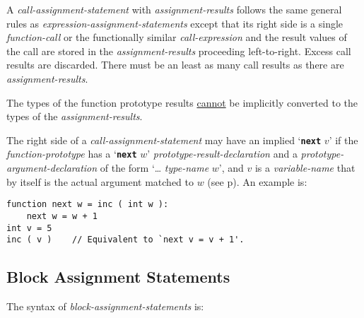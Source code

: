 \documentclass[12pt]{article}
\newcommand{\TT}[1]{{\tt \bfseries #1}}
\newcommand{\pagref}[1]{p\pageref{#1}}
\newenvironment{indpar}[1][0.3in]%
	{\begin{list}{}%
		     {\setlength{\itemsep}{0in}%
		      \setlength{\topsep}{0in}%
		      \setlength{\parsep}{1ex}%
		      \setlength{\labelwidth}{#1}%
		      \setlength{\leftmargin}{#1}%
		      \addtolength{\leftmargin}{\labelsep}}%
	 \item}%
	{\end{list}}
\begin{document}
A {\em call-assignment-statement} with {\em assignment-results}
follows the same general rules
as {\em expres\-sion-assignment-state\-ments} except that its right
side is a single {\em function-call} or the functionally similar
{\em call-expression} and the result values of the call are stored
in the {\em assignment-results} proceeding left-to-right.
Excess call results are discarded.  There must be an least as many
call results as there are {\em assignment-results}.

The types of the function prototype results \underline{cannot}
be implicitly converted to the types of the {\em assignment-results}.

\label{CALL-NEXT-PROMOTION}
The right side of a {\em call-assignment-statement} may have
an implied `\TT{next} $v$' if the {\em function-prototype} has
a `\TT{next} $w$' {\em prototype-result-declaration}
and a {\em prototype-argument-declaration} of the
form `\dots{} {\em type-name} $w$', and $v$ is a {\em variable-name}
that by itself is the actual argument matched to $w$
(see \pagref{PROTOTYPE-NEXT-RESULT}).  An example is:
\begin{indpar}\begin{verbatim}
function next w = inc ( int w ):
    next w = w + 1
int v = 5
inc ( v )    // Equivalent to `next v = v + 1'.
\end{verbatim}\end{indpar}

\subsection{Block Assignment Statements}
\label{BLOCK-ASSIGNMENT-STATEMENTS}

The syntax of {\em block-assignment-statements} is:
\end{document}
